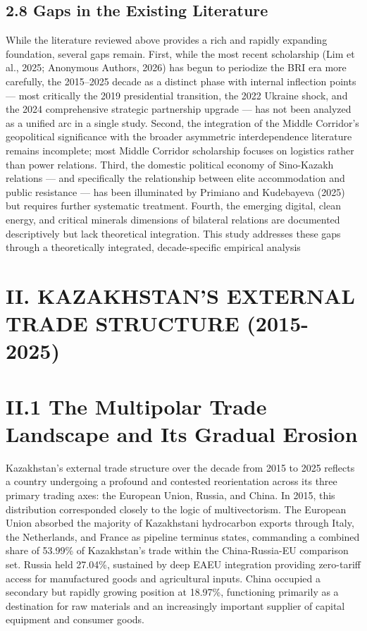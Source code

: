 \documentclass[12pt]{article}
\begin{document}
\subsection{2.8 Gaps in the Existing Literature}
While the literature reviewed above provides a rich and rapidly expanding foundation, several gaps remain. First, while the most recent scholarship (Lim et al., 2025; Anonymous Authors, 2026) has begun to periodize the BRI era more carefully, the 2015--2025 decade as a distinct phase with internal inflection points --- most critically the 2019 presidential transition, the 2022 Ukraine shock, and the 2024 comprehensive strategic partnership upgrade --- has not been analyzed as a unified arc in a single study. Second, the integration of the Middle Corridor's geopolitical significance with the broader asymmetric interdependence literature remains incomplete; most Middle Corridor scholarship focuses on logistics rather than power relations. Third, the domestic political economy of Sino-Kazakh relations --- and specifically the relationship between elite accommodation and public resistance --- has been illuminated by Primiano and Kudebayeva (2025) but requires further systematic treatment. Fourth, the emerging digital, clean energy, and critical minerals dimensions of bilateral relations are documented descriptively but lack theoretical integration. This study addresses these gaps through a theoretically integrated, decade-specific empirical analysis\par

\section{II. KAZAKHSTAN'S EXTERNAL TRADE STRUCTURE (2015-2025)}

\section{II.1 The Multipolar Trade Landscape and Its Gradual Erosion}

Kazakhstan's external trade structure over the decade from 2015 to 2025 reflects a country undergoing a profound and contested reorientation across its three primary trading axes: the European Union, Russia, and China. In 2015, this distribution corresponded closely to the logic of multivectorism. The European Union absorbed the majority of Kazakhstani hydrocarbon exports through Italy, the Netherlands, and France as pipeline terminus states, commanding a combined share of 53.99\% of Kazakhstan's trade within the China-Russia-EU comparison set. Russia held 27.04\%, sustained by deep EAEU integration providing zero-tariff access for manufactured goods and agricultural inputs. China occupied a secondary but rapidly growing position at 18.97\%, functioning primarily as a destination for raw materials and an increasingly important supplier of capital equipment and consumer goods.\par
\end{document}
